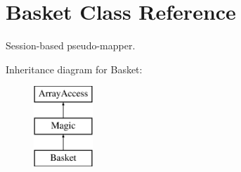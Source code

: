 \hypertarget{class_basket}{}\section{Basket Class Reference}
\label{class_basket}


Session-\/based pseudo-\/mapper.  


Inheritance diagram for Basket\+:\begin{figure}[H]
\begin{center}
\leavevmode
\includegraphics[height=3.000000cm]{class_basket}
\end{center}
\end{figure}
